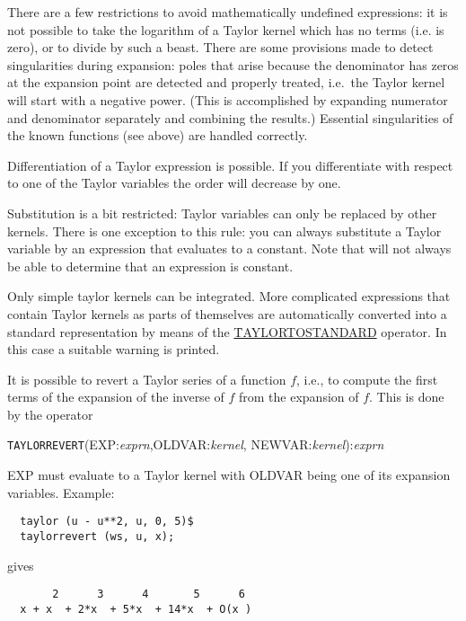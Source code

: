 There are a few restrictions to avoid mathematically undefined
expressions: it is not possible to take the logarithm of a Taylor
kernel which has no terms (i.e. is zero), or to divide by such a
beast.  There are some provisions made to detect singularities during
expansion: poles that arise because the denominator has zeros at the
expansion point are detected and properly treated, i.e.\ the Taylor
kernel will start with a negative power.  (This is accomplished by
expanding numerator and denominator separately and combining the
results.)  Essential singularities of the known functions (see above)
are handled correctly.

Differentiation of a Taylor expression is possible.  If you
differentiate with respect to one of the Taylor variables the order
will decrease by one.

Substitution is a bit restricted: Taylor variables can only be replaced
by other kernels.  There is one exception to this rule: you can always
substitute a Taylor variable by an expression that evaluates to a
constant.  Note that \REDUCE{} will not always be able to determine
that an expression is constant.

Only simple taylor kernels can be integrated. More complicated
expressions that contain Taylor kernels as parts of themselves are
automatically converted into a standard representation by means of the
\hyperlink{operator:TAYLORTOSTANDARD}{\f{TAYLORTOSTANDARD}} operator. 
In this case a suitable warning is printed.

 It is possible to revert a Taylor
series of a function $f$, i.e., to compute the first terms of the
expansion of the inverse of $f$ from the expansion of $f$. This is
done by the operator

\hypertarget{operator:TAYLORREVERT}{}
\hspace*{2em} \texttt{TAYLORREVERT}(EXP:{\em exprn},OLDVAR:{\em kernel},
                                 NEWVAR:{\em kernel}):{\em exprn}

EXP must evaluate to a Taylor kernel with OLDVAR being one of its
expansion variables. Example:
\begin{verbatim}
  taylor (u - u**2, u, 0, 5)$
  taylorrevert (ws, u, x);
\end{verbatim}
gives
\begin{verbatim}
       2      3      4       5      6
  x + x  + 2*x  + 5*x  + 14*x  + O(x )
\end{verbatim}

